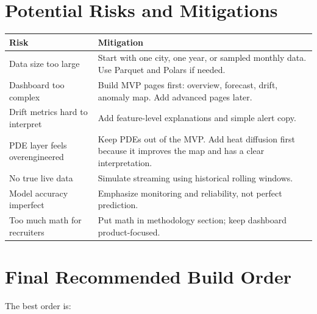 \documentclass[11pt]{article}
\begin{document}
\section{Potential Risks and Mitigations}

\begin{longtable}{p{}p{}}
\toprule
\textbf{Risk} & \textbf{Mitigation} \\
\midrule
Data size too large & Start with one city, one year, or sampled monthly data. Use Parquet and Polars if needed. \\
Dashboard too complex & Build MVP pages first: overview, forecast, drift, anomaly map. Add advanced pages later. \\
Drift metrics hard to interpret & Add feature-level explanations and simple alert copy. \\
PDE layer feels overengineered & Keep PDEs out of the MVP. Add heat diffusion first because it improves the map and has a clear interpretation. \\
No true live data & Simulate streaming using historical rolling windows. \\
Model accuracy imperfect & Emphasize monitoring and reliability, not perfect prediction. \\
Too much math for recruiters & Put math in methodology section; keep dashboard product-focused. \\
\bottomrule
\end{longtable}

\section{Final Recommended Build Order}

The best order is:
\end{document}
